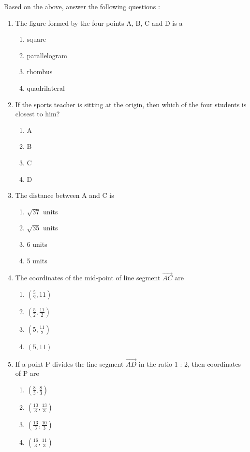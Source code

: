 \documentclass{article}
\begin{document}
\begin{enumerate}
Based on the above, answer the following questions : 	
\begin{enumerate}
\item  The figure formed by the four points A, B, C and D is a 
	\begin{enumerate}
	\item  square 
	\item  parallelogram
	\item  rhombus 
	\item  quadrilateral 
	\end{enumerate}
\item If the sports teacher is sitting at the origin, then which of the four students is closest to him? 
	\begin{enumerate}
	\item  A
	\item  B
	\item  C
	\item  D
	\end{enumerate}
\item The distance between A and C is
	\begin{enumerate}
	\item $\sqrt{37}$ units
	\item $\sqrt{35}$ units
	\item 6 units
	\item 5 units
	\end{enumerate}
\item The coordinates of the mid-point of line segment $\vec{AC}$ are
	\begin{enumerate}
	\item $(\frac{5}{2},11)$
	\item $(\frac{5}{2},\frac{11}{2})$
	\item $(5,\frac{11}{2})$
	\item $(5,11)$
	\end{enumerate}
\item If a point P divides the line segment $\vec{AD}$ in the ratio 1 : 2, then coordinates of P are
	\begin{enumerate}
	\item $(\frac{8}{3},\frac{8}{3})$
	\item $(\frac{10}{3},\frac{13}{3})$
	\item $(\frac{13}{3},\frac{10}{3})$
	\item $(\frac{16}{3},\frac{11}{3})$
	\end{enumerate}
\end{enumerate}
		

\end{enumerate}
\end{document}
